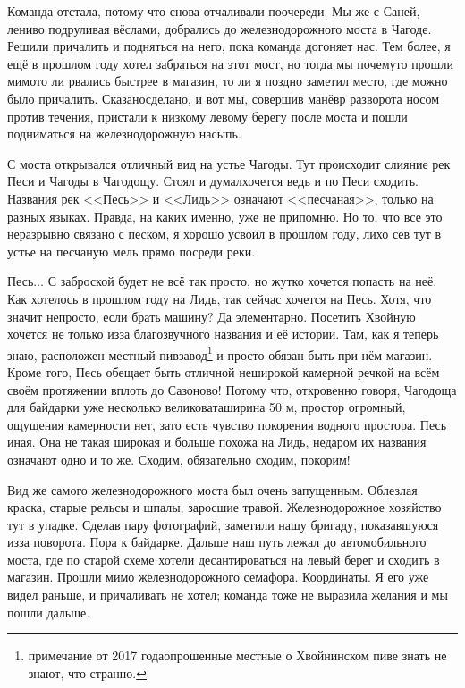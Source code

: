 Команда отстала, потому что снова отчаливали по\sdash очереди. Мы же с Саней, лениво подруливая вёслами, добрались до железнодорожного моста в Чагоде. Решили причалить и подняться на него, пока команда догоняет нас. Тем более, я ещё в прошлом году хотел забраться на этот мост, но тогда мы почему\sdash то прошли мимо\mdash то ли рвались быстрее в магазин, то ли я поздно заметил место, где можно было причалить. Сказано\mdash сделано, и вот мы, совершив манёвр разворота носом против течения, пристали к низкому левому берегу после моста и пошли подниматься на железнодорожную насыпь.

С моста открывался отличный вид на устье Чагоды. Тут происходит слияние рек Песи и Чагоды в Чагодощу. Стоял и думал\mdash хочется ведь и по Песи сходить. Названия рек <<Песь>> и <<Лидь>> означают <<песчаная>>, только на разных языках. Правда, на каких именно, уже не припомню. Но то, что все это неразрывно связано с песком, я хорошо усвоил в прошлом году, лихо сев тут в устье на песчаную мель прямо посреди реки. 

Песь$\ldots$ С заброской будет не всё так просто, но жутко хочется попасть на неё. Как хотелось в прошлом году на Лидь, так сейчас хочется на Песь. Хотя, что значит непросто, если брать машину? Да элементарно. Посетить Хвойную хочется не только из\sdash за благозвучного названия и её истории. Там, как я теперь знаю, расположен местный пивзавод\footnote{примечание от 2017 года\mdash опрошенные местные о Хвойнинском пиве знать не знают, что странно.} и просто обязан быть при нём магазин. Кроме того, Песь обещает быть отличной неширокой камерной речкой на всём своём протяжении вплоть до Сазоново! Потому что, откровенно говоря, Чагодоща для байдарки уже несколько великовата\mdash ширина 50 м, простор огромный, ощущения камерности нет, зато есть чувство покорения водного простора. Песь иная. Она не такая широкая и больше похожа на Лидь, недаром их названия означают одно и то же. Сходим, обязательно сходим, покорим!

Вид же самого железнодорожного моста был очень запущенным. Облезлая краска, старые рельсы и шпалы, заросшие травой. Железнодорожное хозяйство тут в упадке. Сделав пару фотографий, заметили нашу бригаду, показавшуюся из\sdash за поворота. Пора к байдарке. Дальше наш путь лежал до автомобильного моста, где по старой схеме хотели десантироваться на левый берег и сходить в магазин. Прошли мимо железнодорожного семафора. Координаты\mdash \CoordsChagodoschaSemaphor. Я его уже видел раньше, и причаливать не хотел; команда тоже не выразила желания и мы пошли дальше. 

